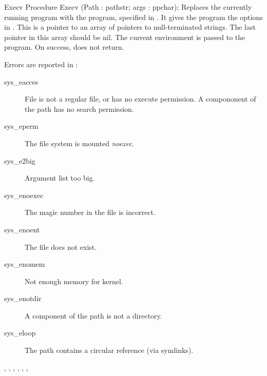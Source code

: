 \begin{procedure}{Execv}
\Declaration
Procedure Execv (Path : pathstr; args : ppchar);
\Description
Replaces the currently running program with the program, specified in
.
It gives the program the options in .
This is a pointer to an array of pointers to null-terminated
strings. The last pointer in this array should be nil.
The current environment is passed to the program.
On success,  does not return.

\Errors
Errors are reported in :
\begin{description}
\item[sys\_eacces] File is not a regular file, or has no execute permission.
A compononent of the path has no search permission.
\item[sys\_eperm] The file system is mounted \textit{noexec}.
\item[sys\_e2big] Argument list too big.
\item[sys\_enoexec] The magic number in the file is incorrect.
\item[sys\_enoent] The file does not exist.
\item[sys\_enomem] Not enough memory for kernel.
\item[sys\_enotdir] A component of the path is not a directory.
\item[sys\_eloop] The path contains a circular reference (via symlinks).
\end{description}
\SeeAlso
{}, , ,
, , ,  
\end{procedure}



